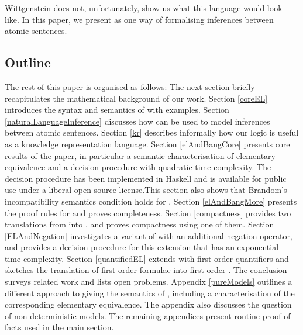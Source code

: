 \NI Wittgenstein does not, unfortunately, show us what this
language would look like.  
In this paper, we present \cathoristic{} as one way of formalising inferences
between atomic sentences.

\subsection{Outline}

\NI The rest of this paper is organised as follows: The next section
briefly recapitulates the mathematical background of our work.
Section \ref{coreEL} introduces the syntax and semantics of
\cathoristic{} with examples. Section \ref{naturalLanguageInference}
discusses how \cathoristic{} can be used to model inferences between
atomic sentences.  Section \ref{kr} describes informally how our logic
is useful as a knowledge representation language.  Section
\ref{elAndBangCore} presents core results of the paper, in particular
a semantic characterisation of elementary equivalence and a decision
procedure with quadratic time-complexity. The decision procedure has
been implemented in Haskell and is available for public use
\cite{HaskellImplementation} under a liberal open-source
license.This section also
shows that Brandom's incompatibility semantics condition holds for
\cathoristic{}.  Section \ref{elAndBangMore} presents the proof rules
for \cathoristic{} and proves completeness. Section \ref{compactness}
provides two translations from \cathoristic{} into \fol{}, and proves
compactness using one of them.  Section \ref{ELAndNegation}
investigates a variant of \cathoristic{} with an additional negation
operator, and provides a decision procedure for this extension that
has an exponential time-complexity.  Section \ref{quantifiedEL}
extends \cathoristic{} with first-order quantifiers and sketches the
translation of first-order formulae into first-order
\cathoristic{}. The conclusion surveys related work and lists open
problems.  Appendix \ref{pureModels} outlines a different approach to
giving the semantics of \cathoristic{}, including a characterisation
of the corresponding elementary equivalence. The appendix also
discusses the question of non-deterministic models. The remaining
appendices present routine proof of facts used in the main section.
